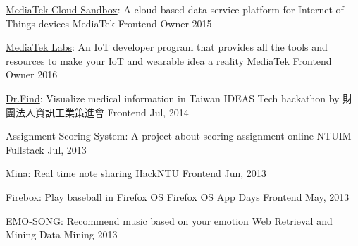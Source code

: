 
\begin{cvhonors}

  \cvhonor
    {\href{https://mcs.mediatek.com/}{MediaTek Cloud Sandbox}: \textmd{A cloud based data service platform for Internet of Things devices}} %
    {MediaTek} %
    {Frontend Owner} %
    {2015} %

  \cvhonor
    {\href{https://labs.mediatek.com/}{MediaTek Labs}: \textmd{An IoT developer program that provides all the tools and resources to make your IoT and wearable idea a reality}} %
    {MediaTek} %
    {Frontend Owner} %
    {2016} %

  \cvhonor
    {\href{https://kdchang.cc/Dr.Find}{Dr.Find}: \textmd{Visualize medical information in Taiwan}} %
    {IDEAS Tech hackathon by 財團法人資訊工業策進會} %
    {Frontend} %
    {Jul, 2014} %

  \cvhonor
    {Assignment Scoring System: \textmd{A project about scoring assignment online}} %
    {NTUIM} %
    {Fullstack} %
    {Jul, 2013} %

  \cvhonor
    {\href{http://minna.herokuapp.com}{Mina}: \textmd{Real time note sharing}} %
    {HackNTU} %
    {Frontend} %
    {Jun, 2013} %

  \cvhonor
    {\href{http://firebox.herokuapp.com}{Firebox}: \textmd{Play baseball in Firefox OS}} %
    {Firefox OS App Days} %
    {Frontend} %
    {May, 2013} %


  \cvhonor
    {\href{http://emo-song.herokuapp.com}{EMO-SONG}: \textmd{Recommend music based on your emotion}} %
    {Web Retrieval and Mining} %
    {Data Mining} %
    {2013} %


\end{cvhonors}
